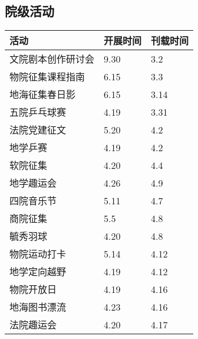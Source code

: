 \documentclass[letterpaper, 12pt]{article}
\begin{document}
\begin{multicols}{2}
\section{院级活动}
\begin{tabular}{|>{\centering\arraybackslash}m{}|m{}|m{}|}
\hline
    活动 & 开展时间 & 刊载时间\\
    \hline\hline
    文院剧本创作研讨会 & 9.30 & 3.2\\
    物院征集课程指南 & 6.15 & 3.3\\
    地海征集春日影 & 6.15 & 3.14\\
    五院乒乓球赛 & 4.19 & 3.31\\
    法院党建征文 & 5.20 & 4.2\\
    地学乒赛 & 4.19 & 4.2\\
    软院征集 & 4.20 & 4.4\\
    地学趣运会 & 4.26 & 4.9\\
    四院音乐节 & 5.11 & 4.7\\
    商院征集 & 5.5 & 4.8\\
    毓秀羽球 & 4.20 & 4.8\\
    物院运动打卡 & 5.14 & 4.12\\
    地学定向越野 & 4.19 & 4.12\\
    物院开放日 & 4.19 & 4.16\\
    地海图书漂流 & 4.23 & 4.16\\
    法院趣运会 & 4.20 & 4.17\\
    \hline
\end{tabular}


\end{multicols}
\end{document}
